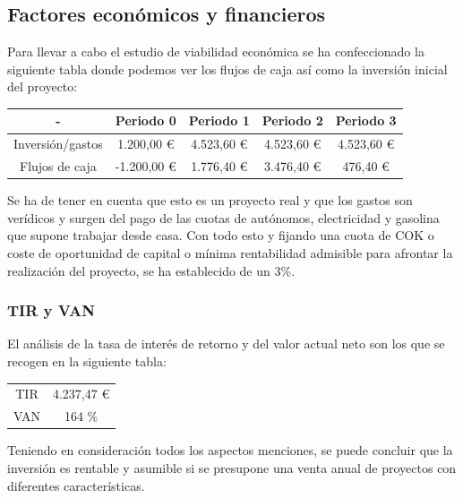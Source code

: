 \documentclass[paper=a4, fontsize=11pt,twoside]{scrartcl}	%
\begin{document}
    \subsection{Factores económicos y financieros}
        Para llevar a cabo el estudio de viabilidad económica se ha confeccionado la siguiente tabla donde
        podemos ver los flujos de caja así como la inversión inicial del proyecto:
        \begin{center}
            \begin{tabular}{||c | c |c |c |c ||} 
            \hline
             - & Periodo 0 & Periodo 1& Periodo 2 & Periodo 3  \\ [0.5ex] 
            \hline
            \hline
                Inversión/gastos &1.200,00 € 	& 4.523,60 € 	& 4.523,60 € 	& 4.523,60 € \\ 
                Flujos de caja  &-1.200,00 € 	& 1.776,40 € 	& 3.476,40 € 	& 476,40 €   \\ 
            \hline
            \end{tabular}
        \end{center}
        Se ha de tener en cuenta que esto es un proyecto real y que los gastos son verídicos y surgen del pago de
        las cuotas de autónomos, electricidad y gasolina que supone trabajar desde casa. Con todo esto y fijando una cuota
        de COK o coste de oportunidad de capital o mínima rentabilidad admisible para afrontar la realización del
        proyecto, se ha establecido de un 3\%.
    \subsubsection{TIR y VAN}
        El análisis de la tasa de interés de retorno y del valor actual neto son los que se recogen en la siguiente tabla:
        \begin{center}
            \begin{tabular}{||c | c ||} 
            \hline
                TIR &4.237,47 € \\ [0.5ex] 
                VAN & 164 \% \\ [0.5ex] 
            \hline
            \end{tabular}
        \end{center}
        Teniendo en consideración todos los aspectos menciones, se puede concluir que la inversión es rentable y asumible
        si se presupone una venta anual de proyectos con diferentes características.
\end{document}
